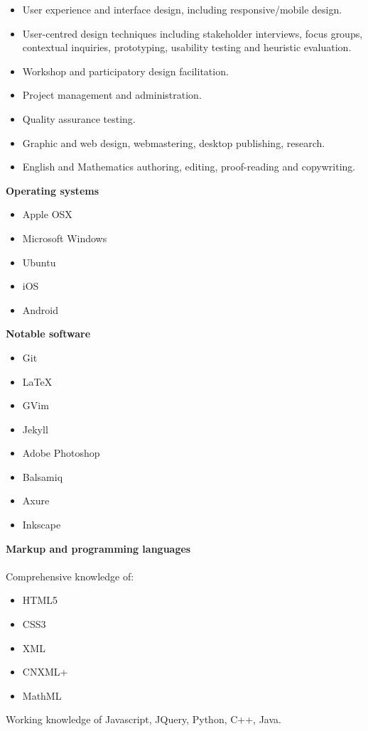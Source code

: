 \documentclass[]{friggeri-cv} %
\begin{document}
\begin{itemize}
\item User experience and interface design, including responsive/mobile design.
\item User-centred design techniques including stakeholder interviews, focus groups, contextual inquiries, prototyping, usability testing and heuristic evaluation.
\item Workshop and participatory design facilitation.
\item Project management and administration.
\item Quality assurance testing.
\item Graphic and web design, webmastering, desktop publishing, research.
\item English and Mathematics authoring, editing, proof-reading and copywriting.

\end{itemize}

\textbf{Operating systems}
\begin{multicols}{2}
\begin{itemize}
 \item Apple OSX
 \item Microsoft Windows
 \item Ubuntu
 \item iOS
 \item Android
\end{itemize}
\end{multicols}

\textbf{Notable software}
\begin{multicols}{2}
\begin{itemize}
 \item Git
 \item LaTeX
 \item GVim
 \item Jekyll
  \item Adobe Photoshop
 \item Balsamiq
 \item Axure
 \item Inkscape
\end{itemize}
\end{multicols}

\textbf{Markup and programming languages}\\
\\
Comprehensive knowledge of: 
\begin{itemize}
 \item HTML5
 \item CSS3
 \item XML
 \item CNXML+
 \item MathML
 \end{itemize}
Working knowledge of Javascript, JQuery, Python, C++, Java.
\end{document}
